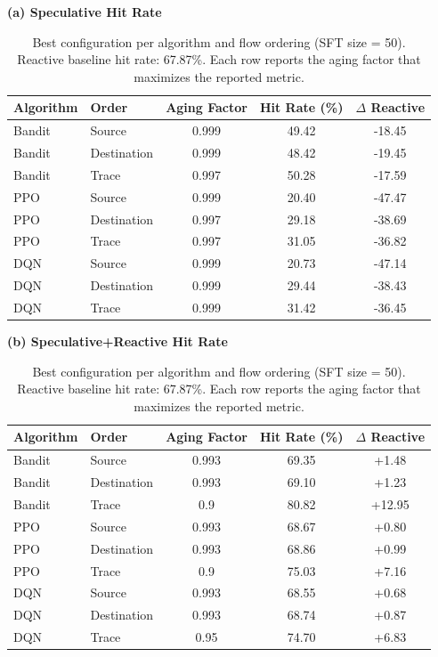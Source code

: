 \begin{table}[t]
\centering
\caption{Best configuration per algorithm and flow ordering (SFT size = 50). Reactive baseline hit rate: 67.87\%. Each row reports the aging factor that maximizes the reported metric.}
\label{tab:combined-metrics-tablesize50}
\small
\textbf{(a) Speculative Hit Rate}\\[0.4em]
\begin{tabular}{@{}llccc@{}}
\toprule
Algorithm & Order & Aging Factor & Hit Rate (\%) & $\Delta$ Reactive \\
\midrule
Bandit & Source & 0.999 & 49.42 & -18.45 \\
Bandit & Destination & 0.999 & 48.42 & -19.45 \\
Bandit & Trace & 0.997 & 50.28 & -17.59 \\
PPO & Source & 0.999 & 20.40 & -47.47 \\
PPO & Destination & 0.997 & 29.18 & -38.69 \\
PPO & Trace & 0.997 & 31.05 & -36.82 \\
DQN & Source & 0.999 & 20.73 & -47.14 \\
DQN & Destination & 0.999 & 29.44 & -38.43 \\
DQN & Trace & 0.999 & 31.42 & -36.45 \\
\bottomrule
\end{tabular}

\vspace{0.8em}
\textbf{(b) Speculative+Reactive Hit Rate}\\[0.4em]
\begin{tabular}{@{}llccc@{}}
\toprule
Algorithm & Order & Aging Factor & Hit Rate (\%) & $\Delta$ Reactive \\
\midrule
Bandit & Source & 0.993 & 69.35 & +1.48 \\
Bandit & Destination & 0.993 & 69.10 & +1.23 \\
Bandit & Trace & 0.9 & 80.82 & +12.95 \\
PPO & Source & 0.993 & 68.67 & +0.80 \\
PPO & Destination & 0.993 & 68.86 & +0.99 \\
PPO & Trace & 0.9 & 75.03 & +7.16 \\
DQN & Source & 0.993 & 68.55 & +0.68 \\
DQN & Destination & 0.993 & 68.74 & +0.87 \\
DQN & Trace & 0.95 & 74.70 & +6.83 \\
\bottomrule
\end{tabular}


\end{table}
